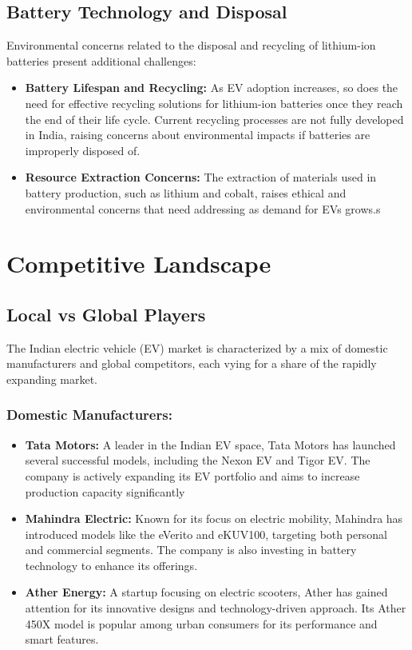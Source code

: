\documentclass[a4paper,12pt]{report}
\begin{document}
\section{Battery Technology and Disposal}
Environmental concerns related to the disposal and recycling of lithium-ion batteries present additional challenges:
\begin{itemize}
    \item \textbf{Battery Lifespan and Recycling: }
    As EV adoption increases, so does the need for effective recycling solutions for lithium-ion batteries once they reach the end of their life cycle. Current recycling processes are not fully developed in India, raising concerns about environmental impacts if batteries are improperly disposed of. \cite{emobility+}\cite{decan}
    \item \textbf{Resource Extraction Concerns: }
    The extraction of materials used in battery production, such as lithium and cobalt, raises ethical and environmental concerns that need addressing as demand for EVs grows.s\cite{codibly}
\end{itemize}

\chapter{Competitive Landscape}
\section{Local vs Global Players}
The Indian electric vehicle (EV) market is characterized by a mix of domestic manufacturers and global competitors, each vying for a share of the rapidly expanding market.
\subsection{Domestic Manufacturers: }
\begin{itemize}
    \item \textbf{Tata Motors: }
    A leader in the Indian EV space, Tata Motors has launched several successful models, including the Nexon EV and Tigor EV. The company is actively expanding its EV portfolio and aims to increase production capacity significantly
    \item \textbf{Mahindra Electric: }
    Known for its focus on electric mobility, Mahindra has introduced models like the eVerito and eKUV100, targeting both personal and commercial segments. The company is also investing in battery technology to enhance its offerings.
    \item \textbf{Ather Energy: }
    A startup focusing on electric scooters, Ather has gained attention for its innovative designs and technology-driven approach. Its Ather 450X model is popular among urban consumers for its performance and smart features.
\end{itemize}
\end{document}
